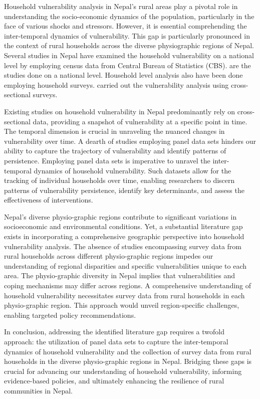 \documentclass[12pt, a4paper]{article}
\begin{document}
Household vulnerability analysis in Nepal's rural areas play a pivotal role in understanding the socio-economic dynamics of the population, particularly in the face of various shocks and stressors. However, it is essential  comprehending the inter-temporal dynamics of vulnerability. This gap is particularly pronounced in the context of rural households across the diverse physiographic regions of Nepal. Several studies in Nepal have examined the household vulnerability on a national level by employing census data from Central Bureau of Statistics (CBS). \cite{aksha2019analysis, shahiestimating} are the studies done on a national level. Household level analysis also have been done employing household surveys. \cite{bista2019grasping, mainali2019mapping, gerlitz2017multidimensional} carried out the vulnerability analysis using cross-sectional surveys. 

Existing studies on household vulnerability in Nepal predominantly rely on cross-sectional data, providing a snapshot of vulnerability at a specific point in time. The temporal dimension is crucial in unraveling the nuanced changes in vulnerability over time. A dearth of studies employing panel data sets hinders our ability to capture the trajectory of vulnerability and identify patterns of persistence. Employing panel data sets is imperative to unravel the inter-temporal dynamics of household vulnerability. Such datasets allow for the tracking of individual households over time, enabling researchers to discern patterns of vulnerability persistence, identify key determinants, and assess the effectiveness of interventions.

Nepal's diverse physio-graphic regions contribute to significant variations in socioeconomic and environmental conditions. Yet, a substantial literature gap exists in incorporating a comprehensive geographic perspective into household vulnerability analysis. The absence of studies encompassing survey data from rural households across different physio-graphic regions impedes our understanding of regional disparities and specific vulnerabilities unique to each area. The physio-graphic diversity in Nepal implies that vulnerabilities and coping mechanisms may differ across regions. A comprehensive understanding of household vulnerability necessitates survey data from rural households in each physio-graphic region. This approach would unveil region-specific challenges, enabling targeted policy recommendations.

In conclusion, addressing the identified literature gap requires a twofold approach: the utilization of panel data sets to capture the inter-temporal dynamics of household vulnerability and the collection of survey data from rural households in the diverse physio-graphic regions in Nepal. Bridging these gaps is crucial for advancing our understanding of household vulnerability, informing evidence-based policies, and ultimately enhancing the resilience of rural communities in Nepal.
\end{document}
